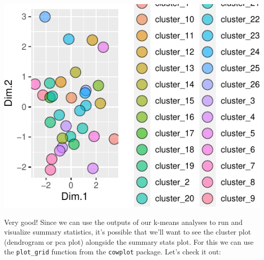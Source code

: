 \documentclass[
]{krantz}
\begin{document}
\begin{center}\includegraphics{index_files/figure-latex/unnamed-chunk-107-1} \end{center}

Very good! Since we can use the outputs of our k-means analyses to run and visualize summary statistics, it's possible that we'll want to see the cluster plot (dendrogram or pca plot) alongside the summary stats plot. For this we can use the \texttt{plot\_grid} function from the \texttt{cowplot} package. Let's check it out:
\end{document}
